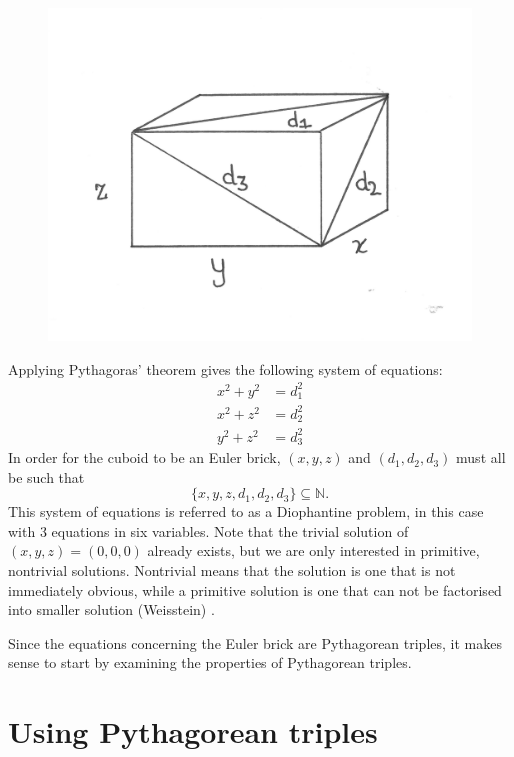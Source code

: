 \documentclass[11pt]{article}
\begin{document}
\begin{figure}[H]
\centering
\includegraphics[scale=0.5]{1.png}
\end{figure}

Applying Pythagoras' theorem gives the following system of equations:
\begin{equation}
\begin{aligned}
x^2+y^2&=d_1^2 \\
x^2+z^2&=d_2^2 \\
y^2+z^2&=d_3^2 
\end{aligned}
\label{eq:1}
\end{equation}
In order for the cuboid to be an Euler brick, $(x, y, z)$ and $(d_1, d_2, d_3)$ must all be such that 
$${\{x, y, z, d_1, d_2, d_3\}}\subseteq{\mathbb{N}}.$$
This system of equations is referred to as a Diophantine problem, in this case with 3 equations in six variables. Note that the trivial solution of $(x, y, z)=(0, 0, 0)$ already exists, but we are only interested in primitive, nontrivial solutions. Nontrivial means that the solution is one that is not immediately obvious, while a primitive solution is one that can not be factorised into smaller solution (Weisstein) \cite{trivial}.

Since the equations concerning the Euler brick are Pythagorean triples, it makes sense to start by examining the properties of Pythagorean triples.

\section{Using Pythagorean triples}
\end{document}
